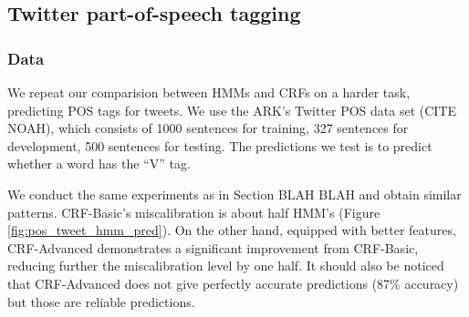 \subsection{Twitter part-of-speech tagging}
\subsubsection{Data}

We repeat our comparision between HMMs and CRFs on a harder task, predicting POS tags for tweets. We use the ARK's Twitter POS data set (CITE NOAH), which consists of 1000 sentences for training, 327 sentences for development, 500 sentences for testing. The predictions we test is to predict whether a word has the ``V'' tag. 

We conduct the same experiments as in Section BLAH BLAH and obtain similar patterns. CRF-Basic's miscalibration is about half HMM's (Figure \ref{fig:pos_tweet_hmm_pred}). On the other hand, equipped with better features, CRF-Advanced demonstrates a significant improvement from CRF-Basic, reducing further the miscalibration level by one half. It should also be noticed that CRF-Advanced does not give perfectly accurate predictions (87\% accuracy) but those are reliable predictions.   

